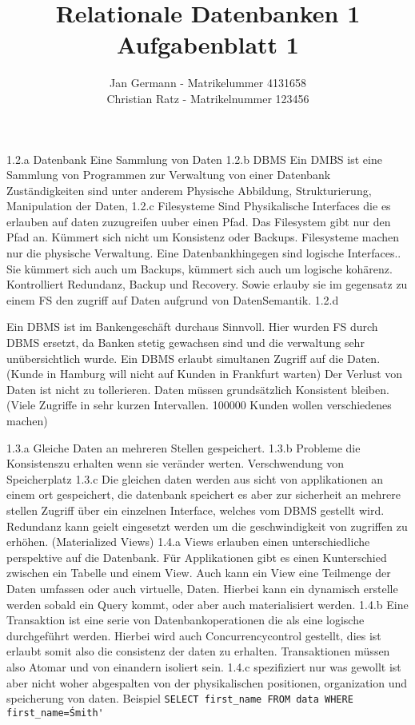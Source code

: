 \documentclass[12pt,a4paper,DIV=9]{scrartcl}
\author{Jan Germann - Matrikelummer 4131658\\Christian Ratz - Matrikelnummer 123456}
\title{Relationale Datenbanken 1\\ Aufgabenblatt 1}
\begin{document}
\maketitle



1.2.a Datenbank
Eine Sammlung von Daten
1.2.b DBMS
Ein DMBS ist eine Sammlung von Programmen zur Verwaltung von einer Datenbank
Zuständigkeiten sind unter anderem Physische Abbildung, Strukturierung, Manipulation der Daten,
1.2.c Filesysteme
Sind Physikalische Interfaces die es erlauben auf daten zuzugreifen uuber einen Pfad. Das Filesystem gibt nur den Pfad an. Kümmert sich nicht um Konsistenz oder Backups. Filesysteme machen nur die physische Verwaltung.
Eine Datenbankhingegen sind logische Interfaces.. Sie kümmert sich auch um Backups, kümmert sich auch um logische kohärenz. Kontrolliert Redundanz, Backup und Recovery. Sowie erlauby sie im gegensatz zu einem FS den zugriff auf Daten aufgrund von DatenSemantik.
1.2.d

Ein DBMS ist im Bankengeschäft durchaus Sinnvoll. Hier wurden FS durch DBMS ersetzt, da Banken stetig gewachsen sind und die verwaltung sehr unübersichtlich wurde. 
Ein DBMS erlaubt simultanen Zugriff auf die Daten.  (Kunde in Hamburg will nicht auf Kunden in Frankfurt warten)
Der Verlust von Daten ist nicht zu tollerieren.
Daten müssen grundsätzlich Konsistent bleiben. (Viele Zugriffe in sehr kurzen Intervallen. 100000 Kunden wollen verschiedenes machen)


1.3.a
Gleiche Daten an mehreren Stellen gespeichert.
1.3.b
Probleme die Konsistenszu erhalten wenn sie veränder werten.
Verschwendung von Speicherplatz
1.3.c
Die gleichen daten werden aus sicht von applikationen an einem ort gespeichert, die datenbank speichert es aber zur sicherheit an mehrere stellen
Zugriff über ein einzelnen Interface, welches vom DBMS gestellt wird.
Redundanz kann geielt eingesetzt werden um die geschwindigkeit von zugriffen zu erhöhen. (Materialized Views)
1.4.a Views erlauben  einen unterschiedliche perspektive auf die Datenbank.  Für Applikationen gibt es einen Kunterschied zwischen ein Tabelle und einem View. Auch kann ein View eine Teilmenge  der Daten umfassen oder auch virtuelle, Daten.  Hierbei kann ein dynamisch erstelle werden sobald ein Query kommt, oder aber auch materialisiert werden.
1.4.b  Eine Transaktion ist eine serie von Datenbankoperationen die als eine logische durchgeführt werden. Hierbei wird auch Concurrencycontrol gestellt, dies ist  erlaubt somit also die consistenz der daten zu erhalten. Transaktionen müssen also Atomar und von einandern isoliert sein.
1.4.c spezifiziert nur was gewollt ist aber nicht woher
abgespalten von der physikalischen positionen, organization und speicherung von daten. Beispiel
\texttt{SELECT first\_name FROM data WHERE first_name=\'Smith\'}
\end{document}
